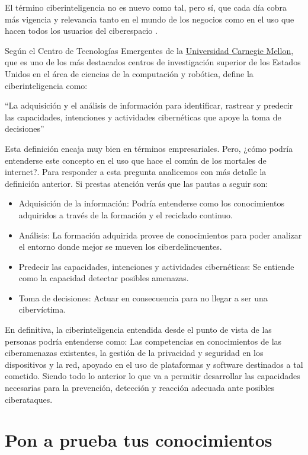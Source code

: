 \documentclass[
  a4paper,
  openany]{book}
\begin{document}
El término ciberinteligencia no es nuevo como tal, pero sí, que cada día cobra más vigencia y relevancia tanto en el mundo de los negocios como en el uso que hacen todos los usuarios del ciberespacio \citep{ciberinteligencia}.

Según el Centro de Tecnologías Emergentes de la \href{https://es.wikipedia.org/wiki/Universidad_Carnegie_Mellon}{Universidad Carnegie Mellon}, que es uno de los más destacados centros de investigación superior de los Estados Unidos en el área de ciencias de la computación y robótica, define la ciberinteligencia como:

``La adquisición y el análisis de información para identificar, rastrear y predecir las capacidades, intenciones y actividades cibernéticas que apoye la toma de decisiones''

Esta definición encaja muy bien en términos empresariales. Pero, ¿cómo podría entenderse este concepto en el uso que hace el común de los mortales de internet?. Para responder a esta pregunta analicemos con más detalle la definición anterior. Si prestas atención verás que las pautas a seguir son:

\begin{itemize}
\item
  Adquisición de la información: Podría entenderse como los conocimientos adquiridos a través de la formación y el reciclado continuo.
\item
  Análisis: La formación adquirida provee de conocimientos para poder analizar el entorno donde mejor se mueven los ciberdelincuentes.
\item
  Predecir las capacidades, intenciones y actividades cibernéticas: Se entiende como la capacidad detectar posibles amenazas.
\item
  Toma de decisiones: Actuar en consecuencia para no llegar a ser una cibervíctima.
\end{itemize}

En definitiva, la ciberinteligencia entendida desde el punto de vista de las personas podría entenderse como: Las competencias en conocimientos de las ciberamenazas existentes, la gestión de la privacidad y seguridad en los dispositivos y la red, apoyado en el uso de plataformas y software destinados a tal cometido. Siendo todo lo anterior lo que va a permitir desarrollar las capacidades necesarias para la prevención, detección y reacción adecuada ante posibles ciberataques.

\hypertarget{pon-a-prueba-tus-conocimientos}{%
\section{Pon a prueba tus conocimientos}\label{pon-a-prueba-tus-conocimientos}}
\end{document}
